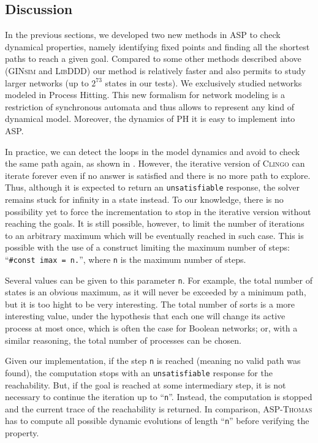 \subsection{Discussion}
\label{sec:discussion}

In the previous sections,
we developed two new methods in ASP to check dynamical properties,
namely identifying fixed points and finding all the shortest paths to reach a given goal.
Compared to some other methods described above
(\textsc{GINsim} and \textsc{LibDDD}) our method is relatively faster and also permits to study larger networks
(up to $2^{73}$ states in our tests). We exclusively studied networks modeled in Process Hitting. This new formalism for network modeling is a restriction of synchronous automata and thus allows to represent any kind of dynamical model. Moreover, the dynamics of PH it is easy to implement into ASP.

In practice, we can detect the loops in the model dynamics and avoid to check the same path again, as shown in .
However, the iterative version of \textsc{Clingo} can iterate forever even if no answer is satisfied and there is no more path to explore.
Thus, although it is expected to return an \texttt{unsatisfiable} response, the solver remains stuck for infinity in a state instead.
To our knowledge, there is no possibility yet to force the incrementation to stop in the iterative version without reaching the goals.
It is still possible, however, to limit the number of iterations to an arbitrary
maximum which will be eventually reached in such case.
This is possible with the use of a construct limiting the maximum number of steps: ``\texttt{\#const imax = n.}'',
where \texttt{n} is the maximum number of steps.

Several values can be given to this parameter \texttt{n}.
For example, the total number of states is an obvious maximum,
as it will never be exceeded by a minimum path,
but it is too hight to be very interesting.
The total number of sorts is a more interesting value,
under the hypothesis that each one will change its active process at most once,
which is often the case for Boolean networks;
or, with a similar reasoning, the total number of processes can be chosen.

Given our implementation, if the step \texttt{n} is reached (meaning no valid path was found),
the computation stops with an \texttt{unsatisfiable} response for the reachability.
But, if the goal is reached at some intermediary step, it is not necessary to continue the iteration up to ``\texttt{n}''.
Instead, the computation is stopped and the current trace of the reachability is returned.
In comparison, \textsc{ASP-Thomas} has to compute all possible dynamic evolutions of length ``\texttt{n}'' before verifying the property.
